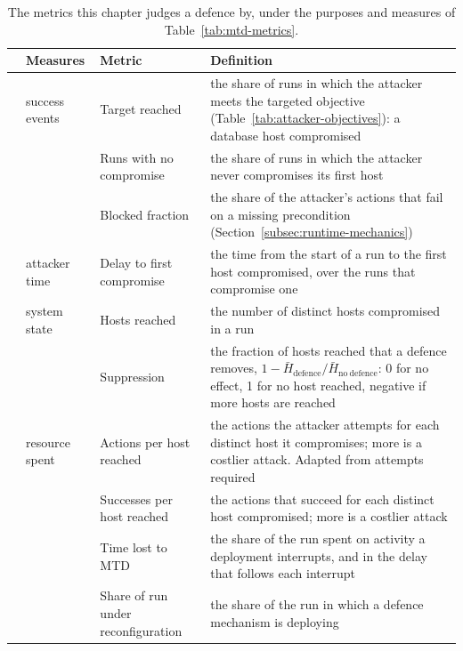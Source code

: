 \begin{table}[htbp]
  \centering
  \caption[The metrics]{The metrics this chapter judges a defence by, under the purposes and measures of Table~\ref{tab:mtd-metrics}.}
  \label{tab:metrics}
  \tablestyle\setlength{\tabcolsep}{4pt}
  \begin{tabular}{@{}cP{1.9cm}P{3.0cm}P{9.4cm}@{}}
    \toprule
    & Measures & Metric & Definition \\
    \midrule
    & success events & Target reached & the share of runs in which the attacker meets the targeted objective (Table~\ref{tab:attacker-objectives}): a database host compromised\\
    & & Runs with no compromise & the share of runs in which the attacker never compromises its first host\\
    & & Blocked fraction & the share of the attacker's actions that fail on a missing precondition (Section~\ref{subsec:runtime-mechanics})\\
    & attacker time & Delay to first compromise & the time from the start of a run to the first host compromised, over the runs that compromise one\\
    & system state & Hosts reached & the number of distinct hosts compromised in a run\\
     & & Suppression & the fraction of hosts reached that a defence removes, $1 - \bar{H}_{\mathrm{defence}} / \bar{H}_{\mathrm{no\ defence}}$: 0 for no effect, 1 for no host reached, negative if more hosts are reached\\
    \midrule
    & resource spent & Actions per host reached & the actions the attacker attempts for each distinct host it compromises; more is a costlier attack. Adapted from attempts required \citep{brown2023} \\
    & & Successes per host reached & the actions that succeed for each distinct host compromised; more is a costlier attack\\
    & & Time lost to MTD & the share of the run spent on activity a deployment interrupts, and in the delay that follows each interrupt\\
     & & Share of run under reconfiguration & the share of the run in which a defence mechanism is deploying\\
    \bottomrule
  \end{tabular}
\end{table}
